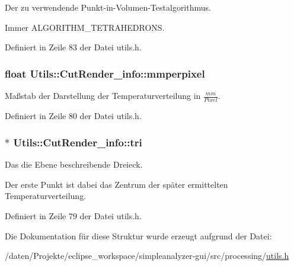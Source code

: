 Der zu verwendende Punkt-\/in-\/\-Volumen-\/\-Testalgorithmus. 

Immer A\-L\-G\-O\-R\-I\-T\-H\-M\-\_\-\-T\-E\-T\-R\-A\-H\-E\-D\-R\-O\-N\-S. 

Definiert in Zeile 83 der Datei utils.\-h.

\hypertarget{structUtils_1_1CutRender__info_aca49d9537a774906b88f3fd7059d2dcb}{
\subsubsection[{mmperpixel}]{\setlength{\rightskip}{0pt plus 5cm}float Utils\-::\-Cut\-Render\-\_\-info\-::mmperpixel}}\label{structUtils_1_1CutRender__info_aca49d9537a774906b88f3fd7059d2dcb}


Maßstab der Darstellung der Temperaturverteilung in $\frac{mm}{Pixel}$. 



Definiert in Zeile 80 der Datei utils.\-h.

\hypertarget{structUtils_1_1CutRender__info_a2998343c733073b317fdd04bd341ce1f}{
\subsubsection[{tri}]{$\ast$ Utils\-::\-Cut\-Render\-\_\-info\-::tri}}\label{structUtils_1_1CutRender__info_a2998343c733073b317fdd04bd341ce1f}


Das die Ebene beschreibende Dreieck. 

Der erste Punkt ist dabei das Zentrum der später ermittelten Temperaturverteilung. 

Definiert in Zeile 79 der Datei utils.\-h.



Die Dokumentation für diese Struktur wurde erzeugt aufgrund der Datei\-:\begin{DoxyCompactItemize}
\item 
/daten/\-Projekte/eclipse\-\_\-workspace/simpleanalyzer-\/gui/src/processing/\hyperlink{simpleanalyzer-gui_2src_2processing_2utils_8h}{utils.\-h}\end{DoxyCompactItemize}

